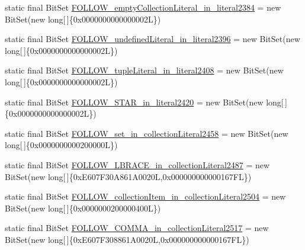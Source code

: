 \begin{DoxyCompactItemize}
\item 
static final Bit\-Set \hyperlink{classorg_1_1tzi_1_1use_1_1parser_1_1ocl_1_1_o_c_l_parser_af9f10d5d7a63d68b71b16d5f0d89c6ba}{F\-O\-L\-L\-O\-W\-\_\-empty\-Collection\-Literal\-\_\-in\-\_\-literal2384} = new Bit\-Set(new long\mbox{[}$\,$\mbox{]}\{0x0000000000000002\-L\})
\item 
static final Bit\-Set \hyperlink{classorg_1_1tzi_1_1use_1_1parser_1_1ocl_1_1_o_c_l_parser_a4c6e6025a50f4be7d1c0549e913ecda4}{F\-O\-L\-L\-O\-W\-\_\-undefined\-Literal\-\_\-in\-\_\-literal2396} = new Bit\-Set(new long\mbox{[}$\,$\mbox{]}\{0x0000000000000002\-L\})
\item 
static final Bit\-Set \hyperlink{classorg_1_1tzi_1_1use_1_1parser_1_1ocl_1_1_o_c_l_parser_ab5d0975407c3ed5fcd39197d259d3b91}{F\-O\-L\-L\-O\-W\-\_\-tuple\-Literal\-\_\-in\-\_\-literal2408} = new Bit\-Set(new long\mbox{[}$\,$\mbox{]}\{0x0000000000000002\-L\})
\item 
static final Bit\-Set \hyperlink{classorg_1_1tzi_1_1use_1_1parser_1_1ocl_1_1_o_c_l_parser_a45d67e43c5cc411f4c7e876be557f437}{F\-O\-L\-L\-O\-W\-\_\-\-S\-T\-A\-R\-\_\-in\-\_\-literal2420} = new Bit\-Set(new long\mbox{[}$\,$\mbox{]}\{0x0000000000000002\-L\})
\item 
static final Bit\-Set \hyperlink{classorg_1_1tzi_1_1use_1_1parser_1_1ocl_1_1_o_c_l_parser_ae4bc943923a8540bbc680ca1f702d554}{F\-O\-L\-L\-O\-W\-\_\-set\-\_\-in\-\_\-collection\-Literal2458} = new Bit\-Set(new long\mbox{[}$\,$\mbox{]}\{0x0000000000200000\-L\})
\item 
static final Bit\-Set \hyperlink{classorg_1_1tzi_1_1use_1_1parser_1_1ocl_1_1_o_c_l_parser_aa216a0d8768672a5909f4b5cc3961482}{F\-O\-L\-L\-O\-W\-\_\-\-L\-B\-R\-A\-C\-E\-\_\-in\-\_\-collection\-Literal2487} = new Bit\-Set(new long\mbox{[}$\,$\mbox{]}\{0x\-E607\-F30\-A861\-A0020\-L,0x000000000000167\-F\-L\})
\item 
static final Bit\-Set \hyperlink{classorg_1_1tzi_1_1use_1_1parser_1_1ocl_1_1_o_c_l_parser_aaa87618aa1d16fd77540aea27592e2b5}{F\-O\-L\-L\-O\-W\-\_\-collection\-Item\-\_\-in\-\_\-collection\-Literal2504} = new Bit\-Set(new long\mbox{[}$\,$\mbox{]}\{0x0000000200000400\-L\})
\item 
static final Bit\-Set \hyperlink{classorg_1_1tzi_1_1use_1_1parser_1_1ocl_1_1_o_c_l_parser_a33788708c876754c9b07a24995712c6c}{F\-O\-L\-L\-O\-W\-\_\-\-C\-O\-M\-M\-A\-\_\-in\-\_\-collection\-Literal2517} = new Bit\-Set(new long\mbox{[}$\,$\mbox{]}\{0x\-E607\-F308861\-A0020\-L,0x000000000000167\-F\-L\})
\item 

\end{DoxyCompactItemize}

